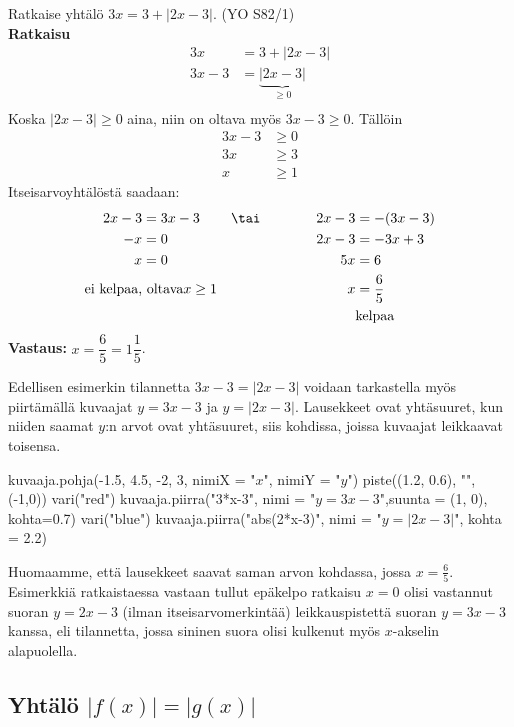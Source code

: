 \begin{esimerkki}
Ratkaise yhtälö $3x=3+|2x-3|$. (YO S82/1)\\
\textbf{Ratkaisu}\\
\begin{align*}
	3x&=3+|2x-3|  \\
	3x-3&=\underbrace{|2x-3|}_{\geq0}  \\
\end{align*}
Koska $|2x-3|\geq0$ aina, niin on oltava myös $3x-3\geq0$. Tällöin
\begin{align*}
	3x-3&\geq0 \\
	3x&\geq3 \\
	x&\geq1
\end{align*}
Itseisarvoyhtälöstä saadaan:
\begin{align*}
	2x-3&=3x-3   &\tai  \qquad \qquad 2x-3&=-(3x-3) \\
	-x&=0        &\ \                  2x-3&=-3x+3 \\
	x&=0         &\ \                  5x&=6 \\
	\text{ei kelpaa,}&\text{ oltava}x\geq1  &\ \  x&=\frac{6}{5} \\
	&\ \         &\ \                 &\text{kelpaa}
\end{align*}
\textbf{Vastaus: }$x=\dfrac{6}{5}=1\dfrac{1}{5}$.

\end{esimerkki}


Edellisen esimerkin tilannetta $3x-3=|2x-3|$ voidaan tarkastella myös piirtämällä kuvaajat $y=3x-3$ ja $y=|2x-3|$. Lausekkeet ovat yhtäsuuret, kun niiden saamat $y$:n arvot ovat yhtäsuuret, siis kohdissa, joissa kuvaajat leikkaavat toisensa.


\begin{kuva}
    kuvaaja.pohja(-1.5, 4.5, -2, 3, nimiX = "$x$", nimiY = "$y$")
    piste((1.2, 0.6), "",(-1,0))
    vari("red")
    kuvaaja.piirra("3*x-3", nimi = "$y=3x - 3$",suunta = (1, 0), kohta=0.7)
    vari("blue")
    kuvaaja.piirra("abs(2*x-3)", nimi = "$y=|2x - 3|$", kohta = 2.2)
\end{kuva}

Huomaamme, että lausekkeet saavat saman arvon kohdassa, jossa \mbox{$x=\frac{6}{5}$}. Esimerkkiä ratkaistaessa vastaan tullut epäkelpo ratkaisu $x=0$ olisi vastannut suoran $y=2x-3$ (ilman itseisarvomerkintää) leikkauspistettä suoran $y=3x-3$ kanssa, eli tilannetta, jossa sininen suora olisi kulkenut myös $x$-akselin alapuolella.

\subsection*{Yhtälö $|f(x)|=|g(x)|$}

